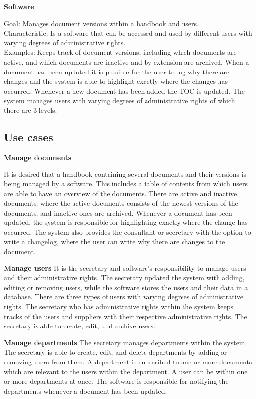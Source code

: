 \textbf{Software}

Goal: Manages document versions within a handbook and users.
\\
Characteristic: Is a software that can be accessed and used by different users with varying degrees of administrative rights.
\\
Examples: Keeps track of document versions; including which documents are active, and which documents are inactive and by extension are archived. When a document has been updated it is possible for the user to log why there are changes and the system is able to highlight exactly where the changes has occurred. 
Whenever a new document has been added the TOC is updated. 
The system manages users with varying degrees of administrative rights of which there are 3 levels.


\subsection{Use cases}

\textbf{Manage documents}

It is desired that a handbook containing several documents and their versions is being managed by a software. This includes a table of contents from which users are able to have an overview of the documents. There are active and inactive documents, where the active documents consists of the newest versions of the documents, and inactive ones are archived. Whenever a document has been updated, the system is responsible for highlighting exactly where the change has occurred. The system also provides the consultant or secretary with the option to write a changelog, where the user can write why there are changes to the document.

\textbf{Manage users}
It is the secretary and software's responsibility to manage users and their administrative rights.
The secretary updated the system with adding, editing or removing users, while the software stores the users and their data in a database.
There are three types of users with varying degrees of administrative rights. 
The secretary who has administrative rights within the system keeps tracks of the users and suppliers with their respective administrative rights. 
The secretary is able to create, edit, and archive users.

\textbf{Manage departments}
The secretary manages departments within the system. 
The secretary is able to create, edit, and delete departments by adding or removing users from them. 
A department is subscribed to one or more documents which are relevant to the users within the department. 
A user can be within one or more departments at once.
The software is responsible for notifying the departments whenever a document has been updated.


